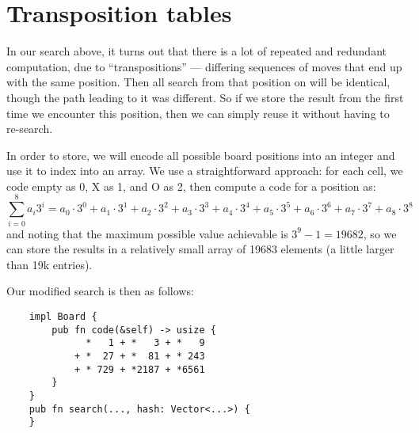\documentclass[10pt,dvipdfmx]{report}
\begin{document}
\section{Transposition tables}

In our search above, it turns out that there is a lot of repeated and
redundant computation, due to ``transpositions'' --- differing sequences of 
moves that end up with the same position.  Then all search from that position
on will be identical, though the path leading to it was different.  So if we
store the result from the first time we encounter this position, then we can
simply reuse it without having to re-search.

In order to store, we will encode all possible board positions into an
integer and use it to index into an array.  We use a straightforward
approach: for each cell, we code empty as 0, X as 1, and O as 2, then
compute a code for a position as:
\[
    \sum_{i=0}^8 a_i 3^i
    = a_0\cdot 3^0 + a_1\cdot 3^1 + a_2\cdot 3^2 +
      a_3\cdot 3^3 + a_4\cdot 3^4 + a_5\cdot 3^5 +
      a_6\cdot 3^6 + a_7\cdot 3^7 + a_8\cdot 3^8
\]
and noting that the maximum possible value achievable is
$3^9-1 = 19682$, so we can store the results in a relatively small array
of 19683 elements (a little larger than 19k entries).

Our modified search is then as follows:
{\small
\begin{verbatim}
    impl Board {
        pub fn code(&self) -> usize {
              *   1 + *   3 + *   9
            + *  27 + *  81 + * 243
            + * 729 + *2187 + *6561
        }
    }
    pub fn search(..., hash: Vector<...>) {
    }
\end{verbatim}
}


%
%
%



\end{document}
